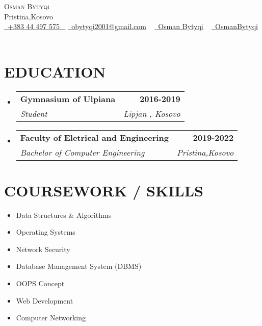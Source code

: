 \documentclass[letterpaper,11pt]{article}
\makeatletter
\newcommand{\resumeSubheading}[4]{
  \vspace{-2pt}\item
    \begin{tabular*}{1.0\textwidth}[t]{l@{\extracolsep{\fill}}r}
      \textbf{\large#1} & \textbf{\small #2} \\
      \textit{\large#3} & \textit{\small #4} \\
      
    \end{tabular*}\vspace{-7pt}
}
\newcommand{\resumeSubHeadingListStart}{\begin{itemize}[leftmargin=0.0in, label={}]}
\newcommand{\resumeSubHeadingListEnd}{\end{itemize}}
\makeatother
\begin{document}


\begin{center}
    {\Huge \scshape Osman Bytyqi} \\ \vspace{1pt}
    Pristina,Kosovo \\ \vspace{1pt}
    \small \href{tel:+383 44 497 575}{ \raisebox{-0.1\height}\faPhone\ \underline{+383 44 497 575} ~} \href{mailto:yourname@gmail.com}{\raisebox{-0.2\height}\faEnvelope\  \underline{obytyqi2001@gmail.com}} ~ 
    \href{https://www.linkedin.com/in/osman-bytyqi-bb6ba31b9/}{\raisebox{-0.2\height}\faLinkedinSquare\ \underline{Osman Bytyqi}}  ~
    \href{https://github.com/OsmanBytyqi}{\raisebox{-0.2\height}\faGithub\ \underline{OsmanBytyqi}} ~
 
    \vspace{-8pt}
\end{center}


\section{EDUCATION}
  \resumeSubHeadingListStart
    \resumeSubheading
      {Gymnasium of Ulpiana}{2016-2019}
      {Student  }{Lipjan , Kosovo}
  \resumeSubHeadingListEnd
  
  \resumeSubHeadingListStart
    \resumeSubheading
      {Faculty of Eletrical and Engineering}{2019-2022}
      {Bachelor of Computer Engineering  }{Pristina,Kosovo}
  \resumeSubHeadingListEnd

\section{COURSEWORK / SKILLS}
        \begin{multicols}{4}
            \begin{itemize}[itemsep=-2pt, parsep=5pt]
                \item Data Structures \& Algorithms
                \item Operating Systems
                \item Network Security
                \item Database Management System (DBMS)
                \item OOPS Concept
                \item Web Development
                \item Computer Networking
            \end{itemize}
        \end{multicols}
        \vspace*{1.0\multicolsep}
\end{document}
